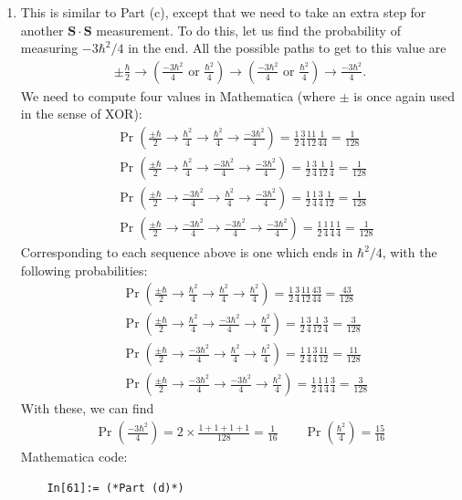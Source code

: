 \documentclass{article}
\theoremstyle{definition}
\newcommand{\f}[2]{\frac{#1}{#2}}
\newcommand{\lp}{\left(}
\newcommand{\rp}{\right)}
\begin{document}
\begin{enumerate}[label=(\alph*)]
	\item This is similar to Part (c), except that we need to take an extra step for another $\mathbf{S}\cdot \mathbf{S}$ measurement. To do this, let us find the probability of measuring $-3\hbar^2/4$ in the end. All the possible paths to get to this value are
	\begin{align*}
	\pm \f{\hbar}{2} \to \lp \f{-3\hbar^2}{4} \text{ or } \f{\hbar^2}{4} \rp \to \lp \f{-3\hbar^2}{4} \text{ or } \f{\hbar^2}{4} \rp \to \f{-3\hbar^2}{4}.
	\end{align*}
	We need to compute four values in Mathematica (where $\pm$ is once again used in the sense of XOR):
	\begin{align*}
	&\Pr\lp \f{\pm \hbar}{2}\to \f{\hbar^2}{4}\to \f{\hbar^2}{4} \to \f{-3\hbar^2}{4} \rp = \f{1}{2}\f{3}{4}\f{11}{12}\f{1}{44} = \f{1}{128} \\
	&\Pr\lp \f{\pm \hbar}{2}\to \f{\hbar^2}{4}\to \f{-3\hbar^2}{4} \to \f{-3\hbar^2}{4} \rp = \f{1}{2}\f{3}{4}\f{1}{12}\f{1}{4} = \f{1}{128} \\
	&\Pr\lp \f{\pm \hbar}{2}\to \f{-3\hbar^2}{4}\to \f{\hbar^2}{4} \to \f{-3\hbar^2}{4} \rp = 
	\f{1}{2}\f{1}{4}\f{3}{4}\f{1}{12} = \f{1}{128} \\
	&\Pr\lp \f{\pm \hbar}{2}\to \f{-3\hbar^2}{4}\to \f{-3\hbar^2}{4} \to \f{-3\hbar^2}{4} \rp =
	\f{1}{2}\f{1}{4}\f{1}{4}\f{1}{4}  = \f{1}{128}
	\end{align*}
	Corresponding to each sequence above is one which ends in $\hbar^2/4$, with the following probabilities:
	\begin{align*}
	&\Pr\lp \f{\pm \hbar}{2}\to \f{\hbar^2}{4}\to \f{\hbar^2}{4} \to \f{\hbar^2}{4} \rp = \f{1}{2}\f{3}{4}\f{11}{12}\f{43}{44} = \f{43}{128}\\
	&\Pr\lp \f{\pm \hbar}{2}\to \f{\hbar^2}{4}\to \f{-3\hbar^2}{4} \to \f{\hbar^2}{4} \rp = \f{1}{2}\f{3}{4}\f{1}{12}\f{3}{4} = \f{3}{128} \\
	&\Pr\lp \f{\pm \hbar}{2}\to \f{-3\hbar^2}{4}\to \f{\hbar^2}{4} \to \f{\hbar^2}{4} \rp = 
	\f{1}{2}\f{1}{4}\f{3}{4}\f{11}{12} =  \f{11}{128}\\
	&\Pr\lp \f{\pm \hbar}{2}\to \f{-3\hbar^2}{4}\to \f{-3\hbar^2}{4} \to \f{\hbar^2}{4} \rp =
	\f{1}{2}\f{1}{4}\f{1}{4}\f{3}{4} = \f{3}{128}
	\end{align*}
	With these, we can find 
	\begin{align*}
	\boxed{\Pr \lp  \f{-3\hbar^2}{4} \rp = 2\times \f{1+1+1+1}{128} = \f{1}{16}} \quad\quad \boxed{\Pr\lp \f{\hbar^2}{4} \rp = \f{15}{16}}
	\end{align*}
	Mathematica code:
	\begin{lstlisting}
	In[61]:= (*Part (d)*)
	

\end{lstlisting}
\end{enumerate}
\end{document}
